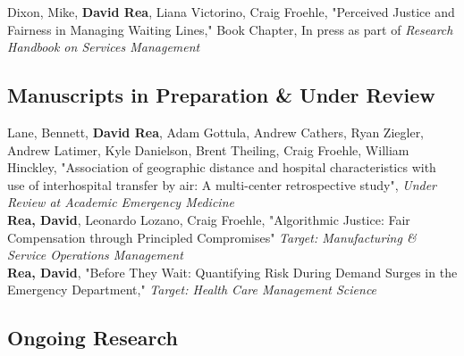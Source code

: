 \documentclass[12pt, letter]{moderncv}
\begin{document}
\medskip
Dixon, Mike, \textbf{David Rea}, Liana Victorino, Craig Froehle, "Perceived Justice and Fairness in Managing Waiting Lines," Book Chapter, \newline In press as part of \textit{Research Handbook on Services Management}


\subsection{Manuscripts in Preparation \& Under Review}
\smallskip
Lane, Bennett, \textbf{David Rea}, Adam Gottula, Andrew Cathers, Ryan Ziegler,  Andrew Latimer,  Kyle Danielson, Brent Theiling, Craig Froehle, William Hinckley,  "Association of geographic distance and hospital characteristics with use of interhospital transfer by air: A multi-center retrospective study", \textit{Under Review at Academic Emergency Medicine}
\medskip\\
\textbf{Rea, David}, Leonardo Lozano, Craig Froehle,  "Algorithmic Justice: Fair Compensation through Principled Compromises" \textit{Target: Manufacturing \& Service Operations Management}
\medskip\\
\textbf{Rea, David}, "Before They Wait: Quantifying Risk During Demand Surges in the Emergency Department," \textit{Target: Health Care Management Science}
\medskip\\
%

\subsection{Ongoing Research}
\end{document}
